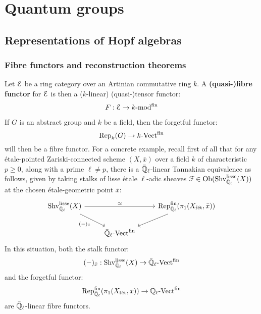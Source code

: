 \section{Quantum groups}
    \subsection{Representations of Hopf algebras}
        \subsubsection{Fibre functors and reconstruction theorems}
            \begin{definition} \label{def: quasi_fibre_functors}
                Let $\mathcal{E}$ be a ring category over an Artinian commutative ring $k$. A \textbf{(quasi-)fibre functor} for $\mathcal{E}$ is then a ($k$-linear) (quasi-)tensor functor:
                    $$F: \mathcal{E} \to k\text{-}\mathrm{mod}^{\mathrm{fin}}$$
            \end{definition}
            \begin{example}
                If $G$ is an abstract group and $k$ be a field, then the forgetful functor:
                    $$\mathrm{Rep}_k(G) \to k\text{-}\mathrm{Vect}^{\mathrm{fin}}$$
                will then be a fibre functor. For a concrete example, recall first of all that for any \'etale-pointed Zariski-connected scheme $(X, \bar{x})$ over a field $k$ of characteristic $p \geq 0$, along with a prime $\ell \not = p$, there is a $\bar{\mathbb{Q}}_{\ell}$-linear Tannakian equivalence as follows, given by taking stalks of lisse \'etale $\ell$-adic sheaves $\mathcal{F} \in \mathrm{Ob}(\mathrm{Shv}_{\bar{\mathbb{Q}}_{\ell}}^{\mathrm{lisse}}(X))$ at the chosen \'etale-geometric point $\bar{x}$:
                    $$
                        \begin{tikzcd}
                        	{\Shv_{\bar{\Q}_{\ell}}^{\lisse}(X)} && {\Rep_{\bar{\Q}_{\ell}}^{\fin}(\pi_1(X_{\fet}, \bar{x}))} \\
                        	& {\bar{\Q}_{\ell}\-\Vect^{\fin}}
                        	\arrow["\cong", from=1-1, to=1-3]
                        	\arrow["{(-)_{\bar{x}}}"', from=1-1, to=2-2]
                        	\arrow[from=1-3, to=2-2]
                        \end{tikzcd}
                    $$
                In this situation, both the stalk functor:
                    $$(-)_{\bar{x}}: \mathrm{Shv}_{\bar{\mathbb{Q}}_{\ell}}^{\mathrm{lisse}}(X) \to \bar{\mathbb{Q}}_{\ell}\text{-}\mathrm{Vect}^{\mathrm{fin}}$$
                and the forgetful functor:
                    $$\mathrm{Rep}_{\bar{\mathbb{Q}}_{\ell}}^{\mathrm{fin}}(\pi_1(X_{\mathrm{f\acute{e}t}}, \bar{x})) \to \bar{\mathbb{Q}}_{\ell}\text{-}\mathrm{Vect}^{\mathrm{fin}}$$
                are $\bar{\mathbb{Q}}_{\ell}$-linear fibre functors. 
            \end{example}

